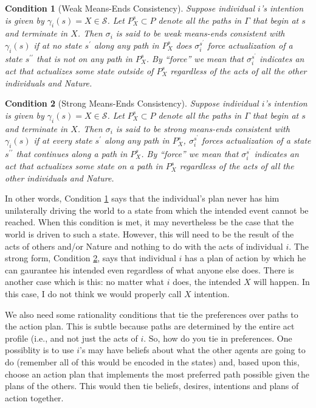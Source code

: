 \documentclass[
11pt,
titlepage,
reqno,
]{article}%
\newtheorem{condition}{Condition}
\theoremstyle{definition}
\begin{document}
	\begin{condition}[Weak Means-Ends Consistency]\label{cond:weak M-E}
		Suppose individual $i$'s intention is given by $\gamma_i(s)=X\in\mathcal{S}$. 
		Let $P^s_X\subset P$ denote all the paths in $\Gamma$ that begin at $s$ and terminate in $X$. 
		Then $\sigma_i$ is said to be \textit{weak means-ends consistent with $\gamma_i(s)$} if at no state $s^\prime$ along any path in $P^s_X$ does $\sigma_i^{s^\prime}$ force actualization of a state $s^{\prime\prime}$ that is not on any path in $P^s_X$. 
		By ``force'' we mean that $\sigma_i^{s^\prime}$ indicates an act that actualizes some state outside of $P^s_X$ regardless of the acts of all the other individuals and Nature. 
	\end{condition}
	
	\begin{condition}[Strong Means-Ends Consistency]\label{cond:strong M-E}
		Suppose individual $i$'s intention is given by $\gamma_i(s)=X\in\mathcal{S}$. 
		Let $P^s_X\subset P$ denote all the paths in $\Gamma$ that begin at $s$ and terminate in $X$. 
		Then $\sigma_i$ is said to be \textit{strong means-ends consistent with $\gamma_i(s)$} if at every state $s^\prime$ along any path in $P^s_X$,  $\sigma_i^{s^\prime}$ forces actualization of a state $s^{\prime\prime}$ that continues along a path in $P^s_X$. 
		By ``force'' we mean that $\sigma_i^{s^\prime}$ indicates an act that actualizes some state on a path in $P^s_X$ regardless of the acts of all the other individuals and Nature. 
	\end{condition}
	
	In other words, Condition \ref{cond:weak M-E} says that the individual's plan never has him unilaterally driving the world to a state from which the intended event cannot be reached. 
	When this condition is met, it may nevertheless be the case that the world is driven to such a state. 
	However, this will need to be the result of the acts of others and/or Nature and nothing to do with the acts of individual $i$. 
	The strong form, Condition \ref{cond:strong M-E}, says that individual $i$ has a plan of action by which he can gaurantee his intended even regardless of what anyone else does.
	There is another case which is this: no matter what $i$ does, the intended $X$ will happen. 
	In this case, I do not think we would properly call $X$ intention. 
	
	We also need some rationality conditions that tie the preferences over paths to the action plan. 
	This is subtle because paths are determined by the entire act profile (i.e., and not just the acts of $i$. 
	So, how do you tie in preferences. One possiblity is to use $i$'s may have beliefs about what the other agents are going to do (remember all of this would be encoded in the states) and, based upon this, choose an action plan that implements the most preferred path possible given the plans of the others. 
	This would then tie beliefs, desires, intentions and plans of action together. 
	
\end{document}
